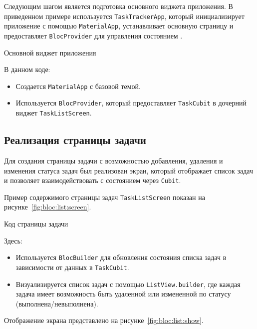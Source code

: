 Следующим шагом является подготовка основного виджета приложения.
В приведенном примере используется \texttt{TaskTrackerApp},
который инициализирует приложение с помощью \texttt{MaterialApp},
устанавливает основную страницу и предоставляет \texttt{BlocProvider}
для управления состоянием .

\begin{image}
	\caption{Основной виджет приложения}
	\label{fig:bloc:app}
\end{image}

В данном коде:

\begin{itemize}
	\item Создается \texttt{MaterialApp} с базовой темой.
	\item Используется \texttt{BlocProvider},
		который предоставляет \texttt{TaskCubit}
		в дочерний виджет \texttt{TaskListScreen}.
\end{itemize}

\subsection{Реализация страницы задачи}

Для создания страницы задачи с возможностью добавления,
удаления и изменения статуса задач был реализован экран,
который отображает список задач
и позволяет взаимодействовать с состоянием через \texttt{Cubit}.

Пример содержимого страницы задач \texttt{TaskListScreen}
показан на рисунке~\ref{fig:bloc:list:screen}.

\begin{image}
	\caption{Код страницы задачи}
	\label{fig:bloc:list:screen}
\end{image}

Здесь:

\begin{itemize}
	\item Используется \texttt{BlocBuilder}
		для обновления состояния списка задач
		в зависимости от данных в \texttt{TaskCubit}.
	\item Визуализируется список задач с помощью \texttt{ListView.builder},
		где каждая задача имеет возможность быть удаленной
		или измененной по статусу (выполнена/невыполнена).
\end{itemize}

Отображение экрана представлено на рисунке~\ref{fig:bloc:list:show}.

